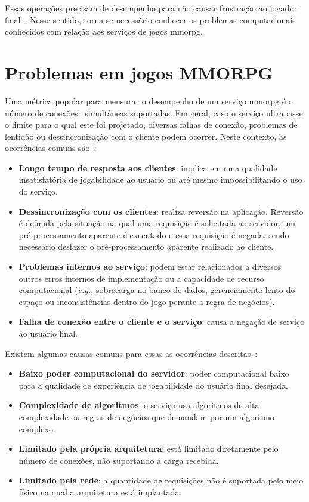 Essas operações precisam de desempenho para não causar frustração ao jogador final~\cite{7008965}.
%
Nesse sentido, torna-se necessário conhecer os problemas computacionais conhecidos com relação aos serviços de jogos \ac{mmorpg}.



\section{Problemas em jogos MMORPG}
\label{sec:problemas}

Uma métrica popular para mensurar o desempenho de um serviço \ac{mmorpg} é o número de conexões~\cite{1417630} simultâneas suportadas.
%
Em geral, caso o serviço ultrapasse o limite para o qual este foi projetado, diversas falhas de conexão, problemas de lentidão ou dessincronização com o cliente podem ocorrer.
%
Neste contexto, as ocorrências comuns são~\cite{1417630}:

\begin{itemize}
  \item \textbf{Longo tempo de resposta aos clientes}: implica em uma qualidade insatisfatória de jogabilidade ao usuário ou até mesmo impossibilitando o uso do serviço.
  \item \textbf{Dessincronização com os clientes}: realiza reversão na aplicação. Reversão é definida pela situação na qual uma requisição é solicitada ao servidor, um pré-processamento aparente é executado e essa requisição é negada, sendo necessário desfazer o pré-processamento aparente realizado ao cliente.
  \item \textbf{Problemas internos ao serviço}:  podem estar relacionados a diversos outros erros internos de implementação ou a capacidade de recurso computacional (\textit{e.g.,} sobrecarga no banco de dados, gerenciamento lento do espaço ou inconsistências dentro do jogo perante a regra de negócios).
  \item \textbf{Falha de conexão entre o cliente e o serviço}: causa a negação de serviço ao usuário final.
\end{itemize}

Existem algumas causas comuns para essas as ocorrências descritas~\cite{1417630}:

\begin{itemize}
  \item \textbf{Baixo poder computacional do servidor}: poder computacional baixo para a qualidade de experiência de jogabilidade do usuário final desejada.
  \item \textbf{Complexidade de algoritmos}: o serviço usa algoritmos de alta complexidade ou regras de negócios que demandam por um algoritmo complexo.
  \item \textbf{Limitado pela própria arquitetura}: está limitado diretamente pelo número de conexões, não suportando a carga recebida.
  \item \textbf{Limitado pela rede}: a quantidade de requisições não é suportada pelo meio físico na qual a arquitetura está implantada.
\end{itemize}


